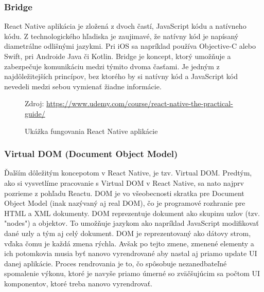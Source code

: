 \subsubsection{Bridge}
React Native aplikácia je zložená z dvoch častí, JavaScript kódu a natívneho kódu. Z technologického hľadiska je zaujimavé, že natívny kód je napísaný diametrálne odlišnými jazykmi. Pri iOS sa napríklad používa Objective-C alebo Swift, pri Androide Java či Kotlin. Bridge je koncept, ktorý umožňuje a zabezpečuje komunikáciu medzi týmito dvoma časťami. Je jedným z najdôležitejších princípov, bez ktorého by si natívny kód a JavaScript kód nevedeli medzi sebou vymienať žiadne informácie. 
\begin{figure}[!htbp]
  \centering  
  \def\stackalignment{c}
           {\scriptsize%
            Zdroj: \url{https://www.udemy.com/course/react-native-the-practical-guide/}}
	\caption{Ukážka fungovania React Native aplikácie}  
  \label{reactAppExplained}
\end{figure}
\subsubsection{Virtual DOM (Document Object Model)}
Ďalším dôležitým koncepotom v React Native, je tzv. Virtual DOM. Predtým, ako si vysvetlíme pracovanie s Virtual DOM v React Native, sa nato najprv pozrieme z pohľadu Reactu. DOM je vo všeobecnosti skratka pre Document Object Model (inak nazývaný aj real DOM), čo je programové rozhranie pre HTML a XML dokumenty. DOM reprezentuje dokument ako skupinu uzlov (tzv. "nodes") a objektov. To umožňuje jazykom ako napríklad JavaScript modifikovať dané uzly a tým aj celý dokument. DOM je reprezentovaný ako dátovy strom, vďaka čomu je každá zmena rýchla. Avšak po tejto zmene, zmenené elementy a ich potomkovia musia byť nanovo vyrendrované aby nastal aj priamo update UI danej aplikácie. Proces rendrovania je to, čo spôsobuje nezanedbateľné spomalenie výkonu, ktoré je navyše priamo úmerné so zväčšujúcim sa počtom UI komponentov, ktoré treba nanovo vyrendrovať.

